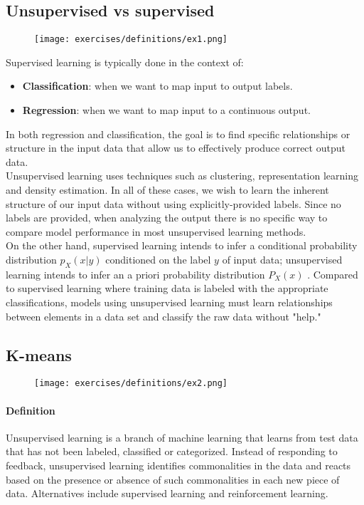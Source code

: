 \subsection{Unsupervised vs supervised}
\begin{figure}[H]
    \centering
    \texttt{[image: exercises/definitions/ex1.png]}
\end{figure}

Supervised learning is typically done in the context of:
\begin{itemize}
\item \textbf{Classification}: when we want to map input to output labels.
\item \textbf{Regression}: when we want to map input to a continuous output.
\end{itemize} 

In both regression and classification, the goal is to find specific relationships or structure in the input data that allow us to effectively produce correct output data.\\

Unsupervised learning uses techniques such as clustering, representation learning and density estimation. In all of these cases, we wish to learn the inherent structure of our input data without using explicitly-provided labels. Since no labels are provided, when analyzing the output there is no specific way to compare model performance in most unsupervised learning methods.\\
 
On the other hand, supervised learning  intends to infer a conditional probability distribution $p_X(x|y)$ conditioned on the label $y$ of input data; unsupervised learning intends to infer an a priori probability distribution $P_X(x)$ . Compared to supervised learning where training data is labeled with the appropriate classifications, models using unsupervised learning must learn relationships between elements in a data set and classify the raw data without "help."

\subsection{K-means}
\begin{figure}[H]
    \centering
    \texttt{[image: exercises/definitions/ex2.png]}
\end{figure}

\paragraph{Definition}
Unsupervised learning is a branch of machine learning that learns from test data that has not been labeled, classified or categorized. Instead of responding to feedback, unsupervised learning identifies commonalities in the data and reacts based on the presence or absence of such commonalities in each new piece of data. Alternatives include supervised learning and reinforcement learning. 

